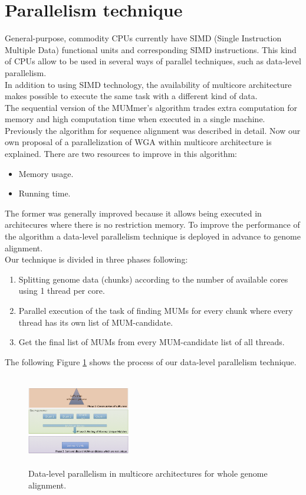 \documentclass[3p,times]{elsarticle}
\begin{document}
\section{Parallelism technique}  
General-purpose, commodity CPUs currently have SIMD (Single Instruction Multiple Data) functional units and corresponding SIMD instructions. This kind of CPUs allow to be used in several ways of parallel techniques, such as data-level parallelism. \\
In addition to using SIMD technology, the availability of multicore architecture makes possible to execute the same task with a different kind of data.\\
The sequential version of the MUMmer's algorithm trades extra computation for memory and high computation time when executed in a single machine. \\
Previously the algorithm for sequence alignment was described in detail. Now our own proposal of a parallelization of WGA within multicore architecture is explained. There are two resources to improve in this algorithm:
\begin{itemize}
\item Memory usage.
\item Running time.
\end{itemize}
The former was generally improved because it allows being executed in architecures where there is no restriction memory. To improve the performance of the algorithm a data-level parallelism technique is deployed in advance to genome alignment.\\
Our technique is divided in three phases following:
\begin{enumerate}
\item Splitting genome data (chunks) according to the number of available cores using 1 thread per core.
\item Parallel execution of the task of finding MUMs for every chunk where every thread has its own list of MUM-candidate.
\item Get the final list of MUMs from every MUM-candidate list of all threads.
\end{enumerate}
The following Figure \ref{algorithm} shows the process of our data-level parallelism technique.
\begin{figure}[htb]  
\begin{center} 
  \includegraphics[width=4.5cm,height=4cm]{Phases.png}
\end{center} 
\caption{Data-level parallelism in multicore architectures for whole genome alignment.} 
\label{algorithm} 
\end{figure} 
\end{document}
